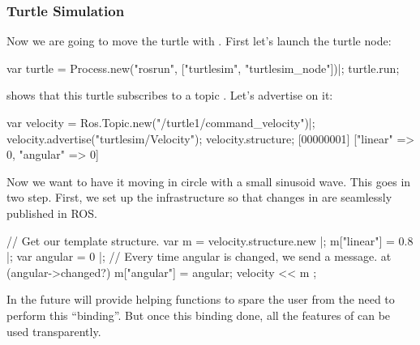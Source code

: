 \subsubsection{Turtle Simulation}
\label{sec:turtlesim}

Now we are going to move the turtle with \urbi. First let's launch the
turtle node:

\begin{urbiunchecked}
var turtle = Process.new("rosrun", ["turtlesim", "turtlesim_node"])|;
turtle.run;
\end{urbiunchecked}

 shows that this turtle subscribes to a topic
. Let's advertise on it:

\begin{urbiunchecked}
var velocity = Ros.Topic.new("/turtle1/command_velocity")|;
velocity.advertise("turtlesim/Velocity");
velocity.structure;
[00000001] ["linear" => 0, "angular" => 0]
\end{urbiunchecked}


Now we want to have it moving in circle with a small sinusoid wave.  This
goes in two step.  First, we set up the infrastructure so that changes in
\urbi are seamlessly published in ROS.

\begin{urbiunchecked}
// Get our template structure.
var m = velocity.structure.new |;
m["linear"] = 0.8 |;
var angular = 0 |;
// Every time angular is changed, we send a message.
at (angular->changed?)
{
  m["angular"] = angular;
  velocity << m
};
\end{urbiunchecked}

\noindent
In the future \urbi will provide helping functions to spare the user from
the need to perform this ``binding''.  But once this binding done, all the
features of \us can be used transparently.

